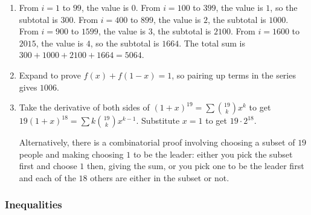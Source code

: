 \documentclass[10pt,paper=letter]{scrartcl}
\begin{document}
\begin{enumerate}
\item From $i = 1$ to $99$, the value is $0$. From $i = 100$ to $399$, the value is $1$, so the subtotal is $300$. From $i = 400$ to $899$, the value is $2$, the subtotal is $1000$. From $i = 900$ to $1599$, the value is $3$, the subtotal is $2100$. From $i = 1600$ to $2015$, the value is $4$, so the subtotal is $1664$. The total sum is $300 + 1000 + 2100 + 1664 = 5064$.

\item Expand to prove $f(x) + f(1-x) = 1$, so pairing up terms in the series gives $1006$.

\item Take the derivative of both sides of $(1 + x)^{19} = \sum \binom{19}k x^k$ to get $19(1 + x)^{18} = \sum k\binom{19}k x^{k-1}$. Substitute $x = 1$ to get $19 \cdot 2^{18}$.

Alternatively, there is a combinatorial proof involving choosing a subset of $19$ people and making choosing $1$ to be the leader: either you pick the subset first and choose $1$ then, giving the sum, or you pick one to be the leader first and each of the $18$ others are either in the subset or not.

\end{enumerate}

\subsubsection*{Inequalities}
\end{document}
